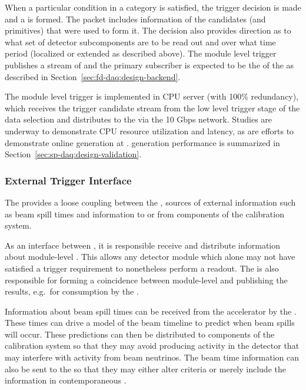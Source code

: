 When a particular condition in a category is satisfied, the trigger
decision is made and a  is formed. 
The  packet includes information of the candidates (and primitives)
that were used to form it. 
The decision also provides direction as to what set of detector subcomponents
are to be read out and over what time period (localized or extended as described above). 
The module level trigger publishes a stream of  and the primary subscriber is expected to be the  of the  as described in Section~\ref{sec:fd-daq:design-backend}.

The module level trigger is implemented in  CPU server (with 100\%
redundancy), which
receives the trigger candidate stream from the low level trigger stage
of the data selection and distributes  to the
 via the 10 Gbps  network. Studies are
underway to demonstrate CPU resource utilization and latency, as are
efforts to demonstrate online  generation at .
 generation performance is summarized in
Section~\ref{sec:sp-daq:design-validation}.

\subsubsection{External Trigger Interface}

The  provides a loose coupling between the , sources of external information such as beam spill times and information to or from components of the calibration system. 

As an interface between , it is responsible receive and distribute information about module-level  .
This allows any detector module which alone may not have satisfied a  trigger requirement to nonetheless perform a  readout.
The  is also responsible for forming a coincidence between module-level   and publishing the results, e.g.~for consumption by the .

Information about beam spill times can be received from the accelerator by the . 
These times can drive a model of the beam timeline to predict when beam spills will occur. 
These predictions can then be distributed to components of the calibration system so that they may avoid producing activity in the detector that may interfere with activity from beam neutrinos.
The beam time information can also be sent to the  so that they may either alter  criteria or merely include the information in contemporaneous .



